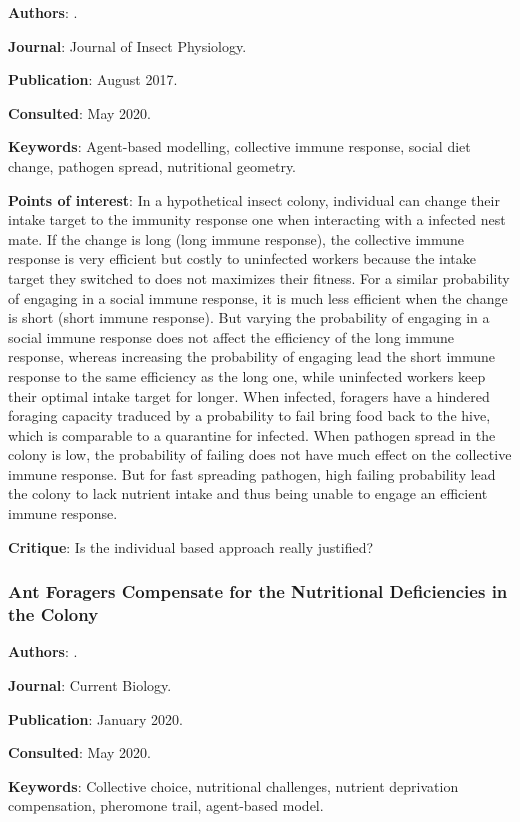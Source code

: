 \documentclass[12pt,a4paper]{article}
\begin{document}
\textbf{Authors}: \cite{POISSONNIER201878}.

\textbf{Journal}: Journal of Insect Physiology.

\textbf{Publication}: August 2017.

\textbf{Consulted}: May 2020.

\textbf{Keywords}: Agent-based modelling, collective immune response, social diet change, pathogen spread, nutritional geometry.

\textbf{Points of interest}: In a hypothetical insect colony, individual can change their intake target to the immunity response one when interacting with a infected nest mate. If the change is long (long immune response), the collective immune response is very efficient but costly to uninfected workers because the intake target they switched to does not maximizes their fitness. For a similar probability of engaging in a social immune response, it is much less efficient when the change is short (short immune response). But varying the probability of engaging in a social immune response does not affect the efficiency of the long immune response, whereas increasing the probability of engaging lead the short immune response to the same efficiency as the long one, while uninfected workers keep their optimal intake target for longer.
When infected, foragers have a hindered foraging capacity traduced by a probability to fail bring food back to the hive, which is comparable to a quarantine for infected. When pathogen spread in the colony is low, the probability of failing does not have much effect on the collective immune response. But for fast spreading pathogen, high failing probability lead the colony to lack nutrient intake and thus being unable to engage an efficient immune response.

\textbf{Critique}: Is the individual based approach really justified? 

\newpage

\subsubsection*{Ant Foragers Compensate for the Nutritional Deficiencies in the Colony}

\textbf{Authors}: \cite{csata2020ant}.

\textbf{Journal}: Current Biology.

\textbf{Publication}: January 2020.

\textbf{Consulted}: May 2020.

\textbf{Keywords}: Collective choice, nutritional challenges, nutrient deprivation compensation, pheromone trail, agent-based model.
\end{document}

